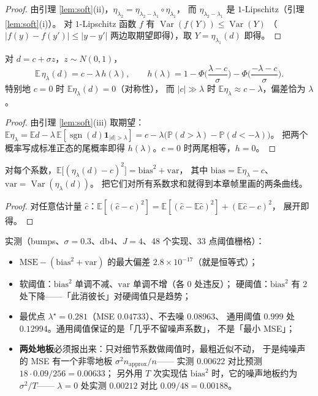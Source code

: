 \begin{proof}
由引理 \ref{lem:soft}(ii)，$\eta_{\lambda_2}=\eta_{\lambda_2-\lambda_1}\circ\eta_{\lambda_1}$，
而 $\eta_{\lambda_2-\lambda_1}$ 是 $1$-Lipschitz（引理 \ref{lem:soft}(i)）。
对 $1$-Lipschitz 函数 $f$ 有 $\operatorname{Var}(f(Y))\le\operatorname{Var}(Y)$
（$|f(y)-f(y')|\le|y-y'|$ 两边取期望即得），取 $Y=\eta_{\lambda_1}(d)$ 即得。
\end{proof}

\begin{theorem}[偏差的显式表达]
\label{thm:bias}
对 $d=c+\sigma z$，$z\sim N(0,1)$，
\[
\mathbb{E}\,\eta_\lambda(d)=c-\lambda\,h(\lambda),\qquad
h(\lambda)=1-\Phi\!\Big(\frac{\lambda-c}{\sigma}\Big)-\Phi\!\Big(\frac{-\lambda-c}{\sigma}\Big).
\]
特别地 $c=0$ 时 $\mathbb{E}\eta_\lambda(d)=0$（对称性），
而 $|c|\gg\lambda$ 时 $\mathbb{E}\eta_\lambda\approx c-\lambda$，偏差恰为 $\lambda$。
\end{theorem}

\begin{proof}
由引理 \ref{lem:soft}(iii) 取期望：
$\mathbb{E}\eta_\lambda=\mathbb{E}d-\lambda\,\mathbb{E}[\operatorname{sgn}(d)\mathbf1_{|d|>\lambda}]
=c-\lambda\big(\mathbb{P}(d>\lambda)-\mathbb{P}(d<-\lambda)\big)$。
把两个概率写成标准正态的尾概率即得 $h(\lambda)$。$c=0$ 时两尾相等，$h=0$。
\end{proof}

\begin{corollary}
\label{cor:mse}
对每个系数，$\mathbb{E}\big[(\eta_\lambda(d)-c)^2\big]=\text{bias}^2+\text{var}$，
其中 $\text{bias}=\mathbb{E}\eta_\lambda-c$、$\text{var}=\operatorname{Var}(\eta_\lambda(d))$。
把它们对所有系数求和就得到本章帧里画的两条曲线。
\end{corollary}

\begin{proof}
对任意估计量 $\hat c$：$\mathbb{E}[(\hat c-c)^2]=\mathbb{E}[(\hat c-\mathbb{E}\hat c)^2]+(\mathbb{E}\hat c-c)^2$，
展开即得。
\end{proof}

实测（bumps、$\sigma=0.3$、db4、$J=4$、48 个实现、33 点阈值栅格）：

\begin{itemize}
  \item $\mathrm{MSE}-(\text{bias}^2+\text{var})$ 的最大偏差 $2.8\times10^{-17}$（就是恒等式）；
  \item 软阈值：$\text{bias}^2$ 单调不减、$\text{var}$ 单调不增（各 $0$ 处违反）；
        硬阈值：$\text{bias}^2$ 有 $2$ 处下降——「此消彼长」对硬阈值只是趋势；
  \item 最优点 $\lambda^\star=0.281$（MSE $0.04733$）、不去噪 $0.08963$、
        通用阈值 $0.999$ 处 $0.12994$。通用阈值保证的是「几乎不留噪声系数」，
        不是「最小 MSE」；
  \item \textbf{两处地板}必须报出来：只对细节系数做阈值时，最粗近似不动，
        于是纯噪声的 MSE 有一个非零地板 $\sigma^2 n_{\text{approx}}/n$——
        实测 $0.00622$ 对比预测 $18\cdot0.09/256=0.00633$；
        另外用 $T$ 次实现估 $\text{bias}^2$ 时，它的噪声地板约为 $\sigma^2/T$——
        $\lambda=0$ 处实测 $0.00212$ 对比 $0.09/48=0.00188$。
\end{itemize}

